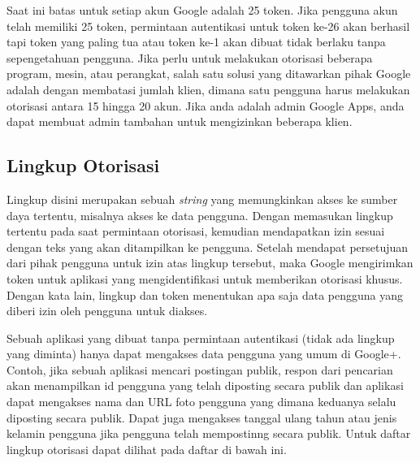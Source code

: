 Saat ini batas untuk setiap akun Google adalah 25 token. Jika pengguna akun telah memiliki 25 token, permintaan autentikasi untuk token ke-26 akan berhasil tapi token yang paling tua atau token ke-1 akan dibuat tidak berlaku tanpa sepengetahuan pengguna. Jika perlu untuk melakukan otorisasi beberapa program, mesin, atau perangkat, salah satu solusi yang ditawarkan pihak Google adalah dengan membatasi jumlah klien, dimana satu pengguna harus melakukan otorisasi antara 15 hingga 20 akun. Jika anda adalah admin Google Apps, anda dapat membuat admin tambahan untuk mengizinkan beberapa klien.

\subsection{Lingkup Otorisasi \cite{Scope:2013}}
Lingkup disini merupakan sebuah {\it string} yang memungkinkan akses ke sumber daya tertentu, misalnya akses ke data pengguna. Dengan memasukan lingkup tertentu pada saat permintaan otorisasi, kemudian mendapatkan izin sesuai dengan teks yang akan ditampilkan ke pengguna. Setelah mendapat persetujuan dari pihak pengguna untuk izin atas lingkup tersebut, maka Google mengirimkan token untuk aplikasi yang mengidentifikasi untuk memberikan otorisasi khusus. Dengan kata lain, lingkup dan token menentukan apa saja data pengguna yang diberi izin oleh pengguna untuk diakses.

Sebuah aplikasi yang dibuat tanpa permintaan autentikasi (tidak ada lingkup yang diminta) hanya dapat mengakses data pengguna yang umum di Google+. Contoh, jika sebuah aplikasi mencari postingan publik, respon dari pencarian akan menampilkan id pengguna yang telah diposting secara publik dan aplikasi dapat mengakses nama dan URL foto pengguna yang dimana keduanya selalu diposting secara publik. Dapat juga mengakses tanggal ulang tahun atau jenis kelamin pengguna jika pengguna telah mempostinng secara publik. Untuk daftar lingkup otorisasi dapat dilihat pada daftar di bawah ini.

